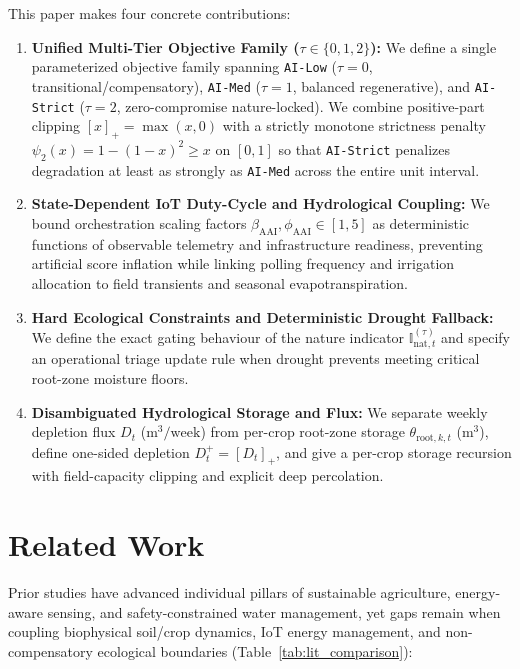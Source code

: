 \documentclass[11pt,a4paper]{article}
\newcommand{\pos}[1]{\left[#1\right]_{+}}
\newcommand{\Inatt}{\mathbb{I}_{\mathrm{nat},t}}
\newcommand{\AAI}{\mathrm{AAI}}
\begin{document}
This paper makes four concrete contributions:
\begin{enumerate}
  \item \textbf{Unified Multi-Tier Objective Family ($\tau \in \{0,1,2\}$):} We define a single parameterized objective family spanning \texttt{AI-Low} ($\tau=0$, transitional/compensatory), \texttt{AI-Med} ($\tau=1$, balanced regenerative), and \texttt{AI-Strict} ($\tau=2$, zero-compromise nature-locked). We combine positive-part clipping $\pos{x} = \max(x, 0)$ with a strictly monotone strictness penalty $\psi_2(x) = 1 - (1 - x)^2 \ge x$ on $[0,1]$ so that \texttt{AI-Strict} penalizes degradation at least as strongly as \texttt{AI-Med} across the entire unit interval.
  \item \textbf{State-Dependent IoT Duty-Cycle and Hydrological Coupling:} We bound orchestration scaling factors $\beta_{\AAI}, \phi_{\AAI} \in [1, 5]$ as deterministic functions of observable telemetry and infrastructure readiness, preventing artificial score inflation while linking polling frequency and irrigation allocation to field transients and seasonal evapotranspiration.
  \item \textbf{Hard Ecological Constraints and Deterministic Drought Fallback:} We define the exact gating behaviour of the nature indicator $\Inatt^{(\tau)}$ and specify an operational triage update rule when drought prevents meeting critical root-zone moisture floors.
  \item \textbf{Disambiguated Hydrological Storage and Flux:} We separate weekly depletion flux $D_t$ ($\mathrm{m}^3/\mathrm{week}$) from per-crop root-zone storage $\theta_{\mathrm{root},k,t}$ ($\mathrm{m}^3$), define one-sided depletion $D_t^+=\pos{D_t}$, and give a per-crop storage recursion with field-capacity clipping and explicit deep percolation.
\end{enumerate}

\section{Related Work}
Prior studies have advanced individual pillars of sustainable agriculture, energy-aware sensing, and safety-constrained water management, yet gaps remain when coupling biophysical soil/crop dynamics, IoT energy management, and non-compensatory ecological boundaries (Table~\ref{tab:lit_comparison}):
\end{document}
